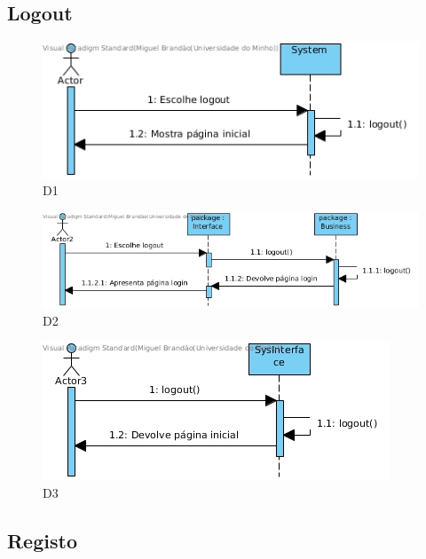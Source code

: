 \subsection{Logout}

\begin{figure}[H]
    \centering
    \includegraphics[width=\textwidth]{diagramas_de_sequencia/imgs/UserSystemUC2D1.jpg}
    \caption{D1}
\end{figure}
\begin{figure}[H]
    \centering
    \includegraphics[width=\textwidth]{diagramas_de_sequencia/imgs/UserSystemUC2D2.jpg}
    \caption{D2}
\end{figure}
\begin{figure}[H]
    \centering
    \includegraphics[width=\textwidth]{diagramas_de_sequencia/imgs/UserSystemUC2D3.jpg}
    \caption{D3}
\end{figure}

\subsection{Registo}

